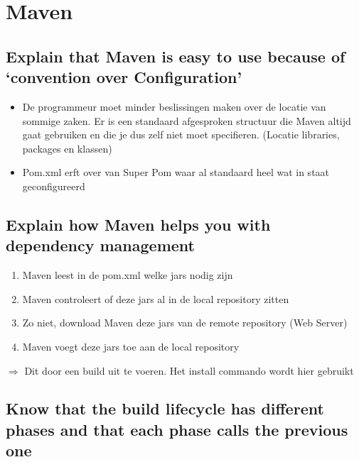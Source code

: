 \chapter{Maven}
\label{Maven}
\thispagestyle{chapternohead}

	
\pagestyle{ruledfilip}



\section{Explain that Maven is easy to use because of ‘convention over Configuration’}

\begin{itemize}
	\item De programmeur moet minder beslissingen maken over de locatie van sommige zaken. Er is een standaard afgesproken structuur die Maven altijd gaat gebruiken en die je dus zelf niet moet specifieren. (Locatie libraries, packages en klassen)
	\item Pom.xml erft over van Super Pom waar al standaard heel wat in staat geconfigureerd
\end{itemize}

\section{Explain how Maven helps you with dependency management}
\begin{enumerate}
	\item Maven leest in de pom.xml welke jars nodig zijn
	\item Maven controleert of deze jars al in de local repository zitten
	\item Zo niet, download Maven deze jars van de remote repository (Web Server)
	\item Maven voegt deze jars toe aan de local repository
\end{enumerate}

$\Rightarrow$ Dit door een build uit te voeren. Het install commando wordt hier gebruikt

\section{Know that the build lifecycle has different phases and that each phase calls the previous one}


